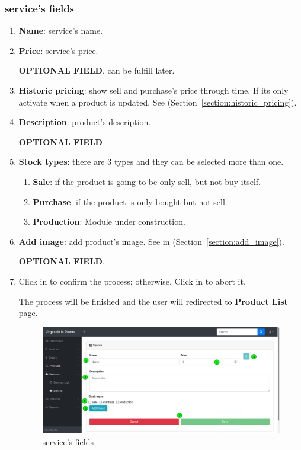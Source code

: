 \documentclass[a4paper,11pt]{refart}
\newcommand\InConstruction{\color{red} Module under construction.}
\begin{document}
\subsubsection{service's fields}
\begin{enumerate}
	\item \textbf{Name}: service's name.
	\item \textbf{Price}: service's price.
	\medskip
	\begin{leftbar}
		\textbf{OPTIONAL FIELD}, can be fulfill later.
	\end{leftbar}
	\item \textbf{Historic pricing}: show sell and purchase's price through time. If its only activate when a product is updated. See (Section~\ref{section:historic_pricing}).
	\item \textbf{Description}: product's description.
	\medskip
	\begin{leftbar}
		\textbf{OPTIONAL FIELD}
	\end{leftbar}
	\item \textbf{Stock types}: there are 3 types and they can be selected more than one.
		\begin{enumerate}
			\item \textbf{Sale}: if the product is going to be only sell, but not buy itself.
			\item \textbf{Purchase}: if the product is only bought but not sell.
			\item \textbf{Production}:  \InConstruction{}
		\end{enumerate}
	\item \textbf{Add image}: add product's image. See in (Section~\ref{section:add_image}).
	\medskip
	\begin{leftbar}
		\textbf{OPTIONAL FIELD}.
	\end{leftbar}
	\item Click in  to confirm the process; otherwise, Click in  to abort it.
		\medskip
		\begin{leftbar}
			The process will be finished and the user will redirected to \textbf{Product List} page.
		\end{leftbar}
	\begin{figure}[H]\centering
		\includegraphics[width=\textwidth]{images/service_form-fields.png}
		\caption{service's fields}
		\label{fig:service_form-fields}
	\end{figure}
\end{enumerate}
\end{document}
